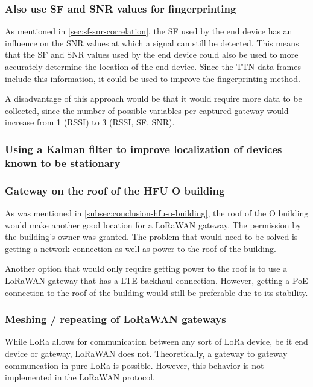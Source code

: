 \subsubsection{Also use \ac{SF} and \ac{SNR} values for fingerprinting}

As mentioned in \cref{sec:sf-snr-correlation}, the \ac{SF} used by the end device has an influence on the \ac{SNR} values at which a signal can still be detected.
This means that the \ac{SF} and \ac{SNR} values used by the end device could also be used to more accurately determine the location of the end device.
Since the \ac{TTN} data frames include this information, it could be used to improve the fingerprinting method.

A disadvantage of this approach would be that it would require more data to be collected, since the number of possible variables per captured gateway would increase from 1 (\ac{RSSI}) to 3 (\ac{RSSI}, \ac{SF}, \ac{SNR}).

\subsubsection{Using a Kalman filter to improve localization of devices known to be stationary}


\subsubsection{Gateway on the roof of the \acs{HFU} O building}

As was mentioned in \cref{subsec:conclusion-hfu-o-building}, the roof of the O building would make another good location for a \ac{LoRaWAN} gateway.
The permission by the building's owner was granted.
The problem that would need to be solved is getting a network connection as well as power to the roof of the building.

Another option that would only require getting power to the roof is to use a \ac{LoRaWAN} gateway that has a \ac{LTE} backhaul connection.
However, getting a \ac{PoE} connection to the roof of the building would still be preferable due to its stability.

\subsubsection{Meshing / repeating of \acs{LoRaWAN} gateways}

While \ac{LoRa} allows for communication between any sort of \ac{LoRa} device, be it end device or gateway, \ac{LoRaWAN} does not.
Theoretically, a gateway to gateway communcation in pure \ac{LoRa} is possible.
However, this behavior is not implemented in the \ac{LoRaWAN} protocol.

